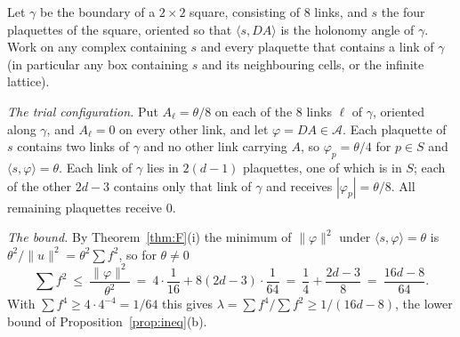 \documentclass[11pt,a4paper]{article}
\theoremstyle{definition}
\theoremstyle{remark}
\newcommand{\cA}{\mathcal{A}}
\begin{document}
Let $\gamma$ be the boundary of a $2\times2$ square, consisting of $8$ links, and $s$ the four plaquettes of the square, oriented so that $\langle s,DA\rangle$ is the holonomy angle of $\gamma$. Work on any complex containing $s$ and every plaquette that contains a link of $\gamma$ (in particular any box containing $s$ and its neighbouring cells, or the infinite lattice).

\emph{The trial configuration.} Put $A_\ell=\theta/8$ on each of the $8$ links $\ell$ of $\gamma$, oriented along $\gamma$, and $A_\ell=0$ on every other link, and let $\varphi=DA\in\cA$. Each plaquette of $s$ contains two links of $\gamma$ and no other link carrying $A$, so $\varphi_p=\theta/4$ for $p\in S$ and $\langle s,\varphi\rangle=\theta$. Each link of $\gamma$ lies in $2(d-1)$ plaquettes, one of which is in $S$; each of the other $2d-3$ contains only that link of $\gamma$ and receives $|\varphi_p|=\theta/8$. All remaining plaquettes receive $0$.

\emph{The bound.} By Theorem~\ref{thm:F}(i) the minimum of $\|\varphi\|^2$ under $\langle s,\varphi\rangle=\theta$ is $\theta^2/\|u\|^2=\theta^2\sum f^2$, so for $\theta\neq0$
\[
\sum f^2\ \le\ \frac{\|\varphi\|^2}{\theta^2}\ =\ 4\cdot\frac1{16}+8(2d-3)\cdot\frac1{64}\ =\ \frac14+\frac{2d-3}8\ =\ \frac{16d-8}{64}.
\]
With $\sum f^4\ge4\cdot4^{-4}=1/64$ this gives $\lambda=\sum f^4/\sum f^2\ge1/(16d-8)$, the lower bound of Proposition~\ref{prop:ineq}(b).
\end{document}
